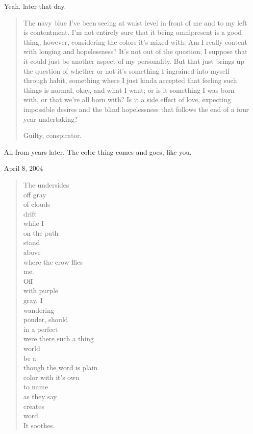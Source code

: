 \begin{paracol}{2}
\begin{leftcolumn}

Yeah, later that day.

\begin{quotation}
The navy blue I've been seeing at waist level in front of me and to my left is contentment.  I'm not entirely sure that it being omnipresent is a good thing, however, considering the colors it's mixed with.  Am I really content with longing and hopelessness?  It's not out of the question, I suppose that it could just be another aspect of my personality.  But that just brings up the question of whether or not it's something I ingrained into myself through habit, something where I just kinda accepted that feeling such things is normal, okay, and what I want; or is it something I was born with, or that we're all born with?  Is it a side effect of love, expecting impossible desires and the blind hopelessness that follows the end of a four year undertaking?


Guilty, conspirator.
\end{quotation}


All from years later. The color thing comes and goes, like you.

April 8, 2004

\begin{verse}
The undersides\\
\vin \vin off gray\\
\vin of clouds\\
\vin drift\\
\vin \vin while I\\
\vin \vin \vin on the path\\
\vin \vin stand\\
\vin above\\
\vin \vin where the crow flies\\
\vin me.\\
Off\\
\vin \vin with purple\\
\vin gray, I\\
\vin \vin wandering\\
\vin ponder, should\\
\vin \vin in a perfect\\
\vin \vin \vin were there such a thing\\
\vin \vin world\\
\vin be a\\
\vin \vin though the word is plain\\
\vin color with it's own\\
\vin \vin to name\\
\vin \vin \vin as they say\\
\vin \vin creates\\
\vin word.\\
It soothes.
\end{verse}


\end{leftcolumn}
\end{paracol}
